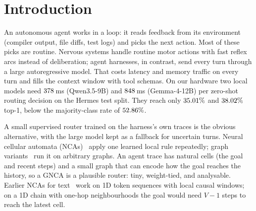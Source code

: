 \documentclass[10pt]{article}
\begin{document}
\section{Introduction}\label{sec:intro}
An autonomous agent works in a loop: it reads feedback from its environment (compiler output, file diffs, test logs) and picks the next action. Most of these picks are routine. Nervous systems handle routine motor actions with fast reflex arcs instead of deliberation; agent harnesses, in contrast, send every turn through a large autoregressive model. That costs latency and memory traffic on every turn and fills the context window with tool schemas. On our hardware two local models need $378$\,ms (Qwen3.5-9B) and $848$\,ms (Gemma-4-12B) per zero-shot routing decision on the Hermes test split. They reach only $35.01\%$ and $38.02\%$ top-1, below the majority-class rate of $52.86\%$.

A small supervised router trained on the harness's own traces is the obvious alternative, with the large model kept as a fallback for uncertain turns. Neural cellular automata (NCAs)~\citep{mordvintsev2020growing} apply one learned local rule repeatedly; graph variants~\citep{grattarola2021learning,gala2023equivariant} run it on arbitrary graphs. An agent trace has natural cells (the goal and recent steps) and a small graph that can encode how the goal reaches the history, so a GNCA is a plausible router: tiny, weight-tied, and analysable. Earlier NCAs for text~\citep{mittal2026textnca} work on 1D token sequences with local causal windows; on a 1D chain with one-hop neighbourhoods the goal would need $V{-}1$ steps to reach the latest cell.
\end{document}

